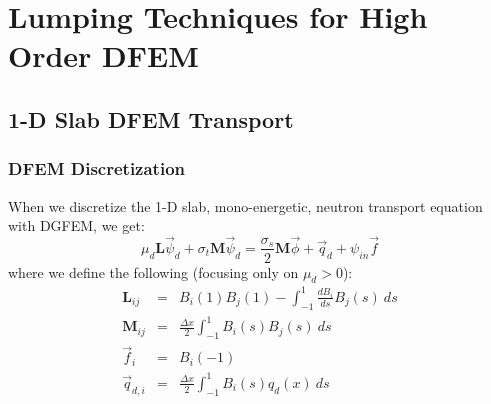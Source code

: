 \documentclass{beamer}
\newcommand{\be}{\begin{equation*}}   %
\newcommand{\ee}{\end{equation*}}
\newcommand{\benum}{\begin{equation}}   %
\newcommand{\eenum}{\end{equation}}
\newcommand{\bea}{\begin{eqnarray*}}  %
\newcommand{\eea}{\end{eqnarray*}}
\newcommand{\B}[1]{\ensuremath{B_{#1} }}			%
\newcommand{\p}{\ensuremath{ \partial}}			%
\newcommand{\M}{\ensuremath{ \mathbf{M} }}
\newif\ifplacelogo %
\begin{document}
\section[Lumping]{Lumping Techniques for High Order DFEM}
\subsection{1-D Slab DFEM Transport}
%

\placelogotrue

\begin{frame}
\frametitle{DFEM Discretization}
When we discretize the 1-D slab, mono-energetic, neutron transport equation with DGFEM, we get:
\be
\mu_d \mathbf{L}\vec{\psi}_d + \sigma_t \M \vec{\psi}_d = \frac{\sigma_s}{2} \M \vec{\phi} + \vec{q}_d + \psi_{in} \vec{f}
\ee
where we define the following (focusing only on $\mu_d > 0$):
\bea
\mathbf{L}_{ij} &=& \B{i}(1)\B{j}(1) - \int_{-1}^1{\frac{d \B{i}}{d s} \B{j}(s)~ds} \\
\mathbf{M}_{ij} &=& \frac{\Delta x}{2}\int_{-1}^1{ \B{i}(s) \B{j}(s)~ds} \\
\vec{f}_{i} &=& \B{i}(-1) \\
\vec{q}_{d,i} &=& \frac{\Delta x}{2} \int_{-1}^1{\B{i}(s) q_d(x)~ds} 
\eea
\end{frame}
\end{document}
